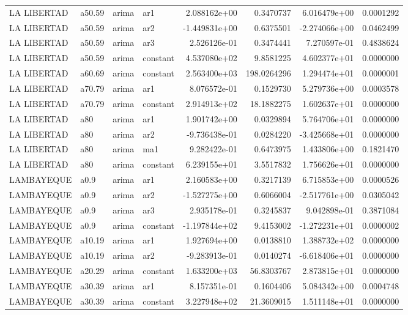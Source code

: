 \documentclass[
]{article}
\begin{document}
\begin{table}[!h]
\begin{tabular}[t]{llllrrrr}
\addlinespace
LA LIBERTAD & a50.59 & arima & ar1 & 2.088162e+00 & 0.3470737 & 6.016479e+00 & 0.0001292\\
LA LIBERTAD & a50.59 & arima & ar2 & -1.449831e+00 & 0.6375501 & -2.274066e+00 & 0.0462499\\
LA LIBERTAD & a50.59 & arima & ar3 & 2.526126e-01 & 0.3474441 & 7.270597e-01 & 0.4838624\\
LA LIBERTAD & a50.59 & arima & constant & 4.537080e+02 & 9.8581225 & 4.602377e+01 & 0.0000000\\
LA LIBERTAD & a60.69 & arima & constant & 2.563400e+03 & 198.0264296 & 1.294474e+01 & 0.0000001\\
\addlinespace
LA LIBERTAD & a70.79 & arima & ar1 & 8.076572e-01 & 0.1529730 & 5.279736e+00 & 0.0003578\\
LA LIBERTAD & a70.79 & arima & constant & 2.914913e+02 & 18.1882275 & 1.602637e+01 & 0.0000000\\
LA LIBERTAD & a80 & arima & ar1 & 1.901742e+00 & 0.0329894 & 5.764706e+01 & 0.0000000\\
LA LIBERTAD & a80 & arima & ar2 & -9.736438e-01 & 0.0284220 & -3.425668e+01 & 0.0000000\\
LA LIBERTAD & a80 & arima & ma1 & 9.282422e-01 & 0.6473975 & 1.433806e+00 & 0.1821470\\
\addlinespace
LA LIBERTAD & a80 & arima & constant & 6.239155e+01 & 3.5517832 & 1.756626e+01 & 0.0000000\\
LAMBAYEQUE & a0.9 & arima & ar1 & 2.160583e+00 & 0.3217139 & 6.715853e+00 & 0.0000526\\
LAMBAYEQUE & a0.9 & arima & ar2 & -1.527275e+00 & 0.6066004 & -2.517761e+00 & 0.0305042\\
LAMBAYEQUE & a0.9 & arima & ar3 & 2.935178e-01 & 0.3245837 & 9.042898e-01 & 0.3871084\\
LAMBAYEQUE & a0.9 & arima & constant & -1.197844e+02 & 9.4153002 & -1.272231e+01 & 0.0000002\\
\addlinespace
LAMBAYEQUE & a10.19 & arima & ar1 & 1.927694e+00 & 0.0138810 & 1.388732e+02 & 0.0000000\\
LAMBAYEQUE & a10.19 & arima & ar2 & -9.283913e-01 & 0.0140274 & -6.618406e+01 & 0.0000000\\
LAMBAYEQUE & a20.29 & arima & constant & 1.633200e+03 & 56.8303767 & 2.873815e+01 & 0.0000000\\
LAMBAYEQUE & a30.39 & arima & ar1 & 8.157351e-01 & 0.1604406 & 5.084342e+00 & 0.0004748\\
LAMBAYEQUE & a30.39 & arima & constant & 3.227948e+02 & 21.3609015 & 1.511148e+01 & 0.0000000\\

\end{tabular}
\end{table}
\end{document}

